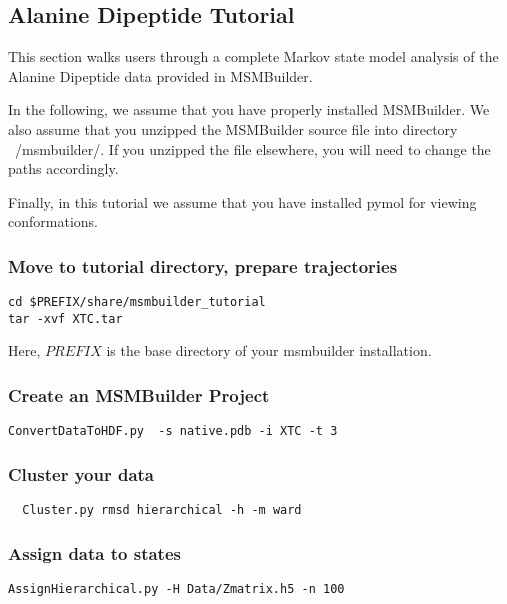 \documentclass[12pt]{article}
\begin{document}
\subsection{Alanine Dipeptide Tutorial}

This section walks users through a complete Markov state model analysis of the Alanine Dipeptide data provided in MSMBuilder.

In the following, we assume that you have properly installed MSMBuilder.  We also assume that you unzipped the MSMBuilder source file into directory ~/msmbuilder/.  If you unzipped the file elsewhere, you will need to change the paths accordingly.  

Finally, in this tutorial we assume that you have installed pymol for viewing conformations.

\subsubsection{Move to tutorial directory, prepare trajectories}
\begin{verbatim}
cd $PREFIX/share/msmbuilder_tutorial 
tar -xvf XTC.tar
\end{verbatim}

Here, $PREFIX$ is the base directory of your msmbuilder installation.

\subsubsection{Create an MSMBuilder Project}
\begin{verbatim}
ConvertDataToHDF.py  -s native.pdb -i XTC -t 3
\end{verbatim}

\subsubsection{Cluster your data}
\begin{verbatim}
  Cluster.py rmsd hierarchical -h -m ward
\end{verbatim}

\subsubsection{Assign data to states}

\begin{verbatim}
AssignHierarchical.py -H Data/Zmatrix.h5 -n 100
\end{verbatim}
\end{document}
